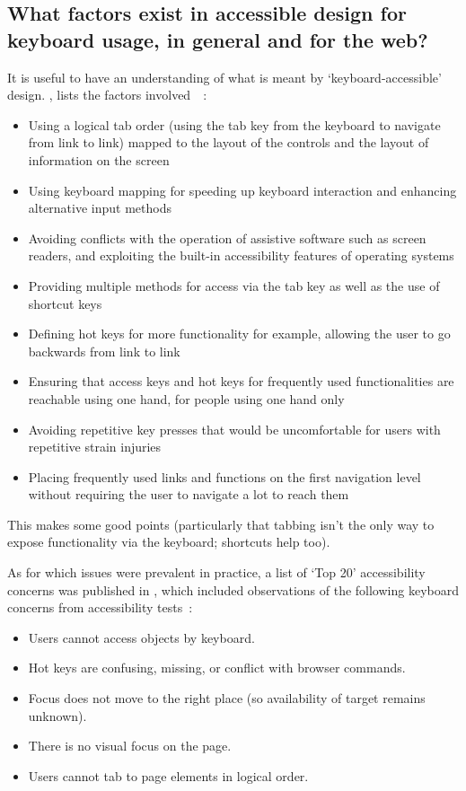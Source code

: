 \documentclass[a4paper, 11pt]{article}
\begin{document}
\subsection{What factors exist in accessible design for keyboard usage, in general and for the web?}
It is useful to have an understanding of what is meant by `keyboard-accessible' design. \citeauthor{deng}, \citeyear{deng} lists the factors involved~\cite{deng}~\parencite[as cited in][]{dellaporta2007web}:
\begin{itemize}
\item Using a logical tab order (using the tab key from the keyboard to navigate from link to link) mapped to the layout of the controls and the layout of information on the screen
\item Using keyboard mapping for speeding up keyboard interaction and enhancing alternative input methods
\item Avoiding conflicts with the operation of assistive software such as screen readers, and exploiting the built-in accessibility features of operating systems
\item Providing multiple methods for access via the tab key as well as the use of shortcut keys
\item Defining hot keys for more functionality for example, allowing the user to go backwards from link to link
\item Ensuring that access keys and hot keys for frequently used functionalities are reachable using one hand, for people using one hand only
\item Avoiding repetitive key presses that would be uncomfortable for users with repetitive strain injuries
\item Placing frequently used links and functions on the first navigation level without requiring the user to navigate a lot to reach them
\end{itemize}
This makes some good points (particularly that tabbing isn't the only way to expose functionality via the keyboard; shortcuts help too).

As for which issues were prevalent in practice, a list of `Top 20' accessibility concerns was published in \citeyear{hoffman2005emerging}, which included observations of the following keyboard concerns from accessibility tests~\cite{hoffman2005emerging}:
\begin{itemize}
\item Users cannot access objects by keyboard.
\item Hot keys are confusing, missing, or conflict with browser commands.
\item Focus does not move to the right place (so availability of target remains unknown).
\item There is no visual focus on the page.
\item Users cannot tab to page elements in logical order.
\end{itemize}
\end{document}
